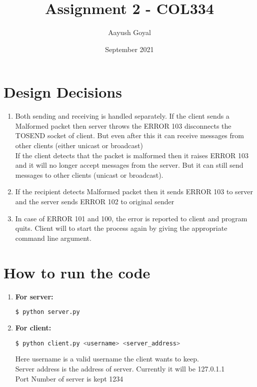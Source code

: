 \documentclass{article}
\title{Assignment 2 - COL334}
\author{Aayush Goyal}
\date{September 2021}
\begin{document}
\maketitle

\section{Design Decisions}

\begin{enumerate}
    \item Both sending and receiving is handled separately. If the client sends a Malformed packet then server throws the ERROR 103 disconnects the TOSEND socket of client. But even after this it can receive messages from other clients (either unicast or broadcast)\\
    If the client detects that the packet is malformed then it raises ERROR 103 and it will no longer accept messages from the server. But it can still send messages to other clients (unicast or broadcast).
    
    \item If the recipient detects Malformed packet then it sends ERROR 103 to server and the server sends ERROR 102 to original sender
    
    \item In case of ERROR 101 and 100, the error is reported to client and program quits. Client will to start the process again by giving the appropriate command line argument.
    
\end{enumerate}

\section{How to run the code}
\begin{enumerate}
    \item \textbf{For server:}
    \begin{lstlisting}[language=bash]
      $ python server.py
    \end{lstlisting}
    \item \textbf{For client:}
    \begin{lstlisting}[language=bash]
      $ python client.py <username> <server_address>
    \end{lstlisting}
    Here username is a valid username the client wants to keep.\\
    Server address is the address of server. Currently it will be 127.0.1.1\\
    Port Number of server is kept 1234
\end{enumerate}
\end{document}
